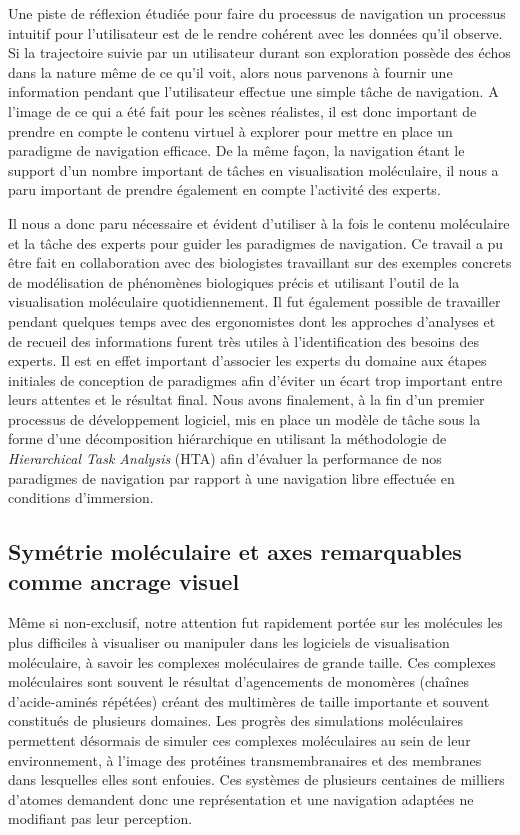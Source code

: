 Une piste de réflexion étudiée pour faire du processus de navigation un processus intuitif pour l'utilisateur est de le rendre cohérent avec les données qu'il observe. Si la trajectoire suivie par un utilisateur durant son exploration possède des échos dans la nature même de ce qu'il voit, alors nous parvenons à fournir une information pendant que l'utilisateur effectue une simple tâche de navigation. A l'image de ce qui a été fait pour les scènes réalistes, il est donc important de prendre en compte le contenu virtuel à explorer pour mettre en place un paradigme de navigation efficace. De la même façon, la navigation étant le support d'un nombre important de tâches en visualisation moléculaire, il nous a paru important de prendre également en compte l'activité des experts. 

Il nous a donc paru nécessaire et évident d'utiliser à la fois le contenu moléculaire et la tâche des experts pour guider les paradigmes de navigation. Ce travail a pu être fait en collaboration avec des biologistes travaillant sur des exemples concrets de modélisation de phénomènes biologiques précis et utilisant l'outil de la visualisation moléculaire quotidiennement. Il fut également possible de travailler pendant quelques temps avec des ergonomistes dont les approches d'analyses et de recueil des informations furent très utiles à l'identification des besoins des experts. Il est en effet important d'associer les experts du domaine aux étapes initiales de conception de paradigmes afin d'éviter un écart trop important entre leurs attentes et le résultat final.
Nous avons finalement, à la fin d'un premier processus de développement logiciel, mis en place un modèle de tâche sous la forme d'une décomposition hiérarchique en utilisant la méthodologie de \textit{Hierarchical Task Analysis} (HTA) afin d'évaluer la performance de nos paradigmes de navigation par rapport à une navigation libre effectuée en conditions d'immersion.

\subsection{Symétrie moléculaire et axes remarquables comme ancrage visuel}

Même si non-exclusif, notre attention fut rapidement portée sur les molécules les plus difficiles à visualiser ou manipuler dans les logiciels de visualisation moléculaire, à savoir les complexes moléculaires de grande taille. Ces complexes moléculaires sont souvent le résultat d'agencements de monomères (chaînes d'acide-aminés répétées) créant des multimères de taille importante et souvent constitués de plusieurs domaines. Les progrès des simulations moléculaires permettent désormais de simuler ces complexes moléculaires au sein de leur environnement, à l'image des protéines transmembranaires et des membranes dans lesquelles elles sont enfouies. Ces systèmes de plusieurs centaines de milliers d'atomes demandent donc une représentation et une navigation adaptées ne modifiant pas leur perception.

